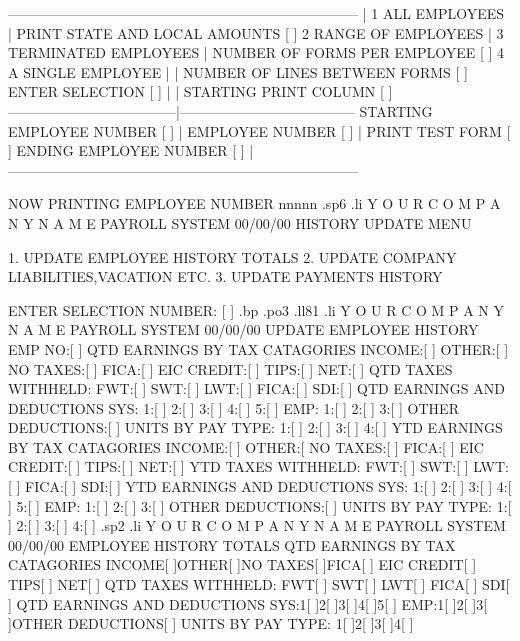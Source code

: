  ---------------------------------------------------------------------------
				     |
      1  ALL EMPLOYEES		     |	PRINT STATE AND LOCAL AMOUNTS  [ ]
      2  RANGE OF EMPLOYEES	     |
      3  TERMINATED EMPLOYEES	     |	NUMBER OF FORMS PER EMPLOYEE   [  ]
      4  A SINGLE EMPLOYEE	     |
				     |	NUMBER OF LINES BETWEEN FORMS  [  ]
	 ENTER SELECTION [ ]	     |
				     |	STARTING PRINT COLUMN	       [  ]
 ------------------------------------|--------------------------------------
   STARTING EMPLOYEE NUMBER [	  ]  |
       EMPLOYEE NUMBER	 [     ]     |	      PRINT TEST FORM [ ]
   ENDING EMPLOYEE NUMBER   [	  ]  |
 ---------------------------------------------------------------------------

		  NOW PRINTING EMPLOYEE NUMBER nnnnn
.sp6
.li
		      Y O U R	C O M P A N Y	N A M E
			      PAYROLL SYSTEM
  00/00/00		    HISTORY UPDATE MENU



		  1.  UPDATE EMPLOYEE HISTORY TOTALS
		  2.  UPDATE COMPANY LIABILITIES,VACATION ETC.
		  3.  UPDATE PAYMENTS HISTORY



			 ENTER SELECTION NUMBER: [ ]
.bp
.po3
.ll81
.li
		      Y O U R	C O M P A N Y	 N A M E
				PAYROLL SYSTEM
  00/00/00		    UPDATE EMPLOYEE HISTORY
     EMP NO:[	  ]
			 QTD EARNINGS BY TAX CATAGORIES
INCOME:[	  ]  OTHER:[	      ] NO TAXES:[	    ] FICA:[	      ]
		EIC CREDIT:[	      ]     TIPS:[	    ]  NET:[	      ]
QTD TAXES WITHHELD:    FWT:[	      ]      SWT:[	    ]  LWT:[	      ]
		      FICA:[	      ]      SDI:[	    ]
			    QTD EARNINGS AND DEDUCTIONS
SYS: 1:[	  ] 2:[ 	 ] 3:[		] 4:[	       ] 5:[	      ]
EMP: 1:[	  ] 2:[ 	 ] 3:[		] OTHER DEDUCTIONS:[	      ]
UNITS BY PAY TYPE:  1:[ 	 ] 2:[		] 3:[	       ] 4:[	      ]
			 YTD EARNINGS BY TAX CATAGORIES
INCOME:[	  ]  OTHER:[		NO TAXES:[	    ] FICA:[	      ]
		EIC CREDIT:[	      ]     TIPS:[	    ]  NET:[	      ]
YTD TAXES WITHHELD:    FWT:[	      ]      SWT:[	    ]  LWT:[	      ]
		      FICA:[	      ]      SDI:[	    ]
			    YTD EARNINGS AND DEDUCTIONS
SYS: 1:[	  ] 2:[ 	 ] 3:[		] 4:[	       ] 5:[	      ]
EMP: 1:[	  ] 2:[ 	 ] 3:[		] OTHER DEDUCTIONS:[	      ]
UNITS BY PAY TYPE:  1:[ 	 ] 2:[		] 3:[	       ] 4:[	      ]
.sp2
.li
		       Y O U R	 C O M P A N Y	 N A M E
				PAYROLL SYSTEM
  00/00/00		    EMPLOYEE HISTORY TOTALS
			 QTD EARNINGS BY TAX CATAGORIES
INCOME[ 	   ]OTHER[	      ]NO TAXES[	    ]FICA[	      ]
	       EIC CREDIT[	      ]    TIPS[	    ] NET[	      ]
QTD TAXES WITHHELD:   FWT[	      ]     SWT[	    ] LWT[	      ]
		     FICA[	      ]     SDI[	    ]
			    QTD EARNINGS AND DEDUCTIONS
SYS:1[		  ]2[		 ]3[		]4[	       ]5[	      ]
EMP:1[		  ]2[		 ]3[		]OTHER DEDUCTIONS[	      ]
UNITS BY PAY TYPE: 1[		 ]2[		]3[	       ]4[	      ]

